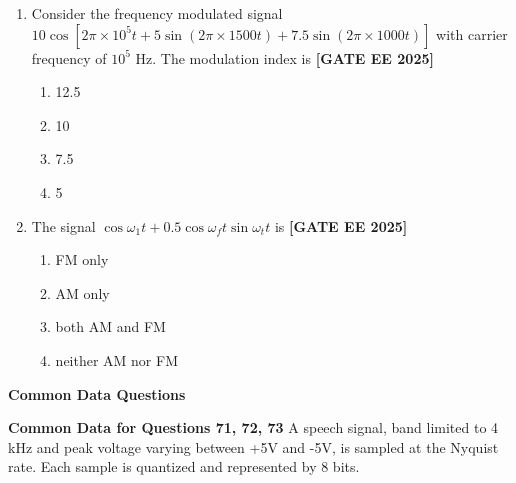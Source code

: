 \documentclass[12pt,a4paper]{article}
\begin{document}
\begin{enumerate}[leftmargin=*, label=\textbf{Q.\arabic*:}]
\item Consider the frequency modulated signal $10\cos[2\pi \times 10^5 t + 5\sin(2\pi \times 1500 t) + 7.5\sin(2\pi \times 1000 t)]$ with carrier frequency of $10^5$ Hz. The modulation index is
\newline
\noindent \textbf{[GATE EE 2025]}
\begin{enumerate}[label=(\Alph*)]
  \item 12.5
  \item 10
  \item 7.5
  \item 5
\end{enumerate}

\item The signal $\cos \omega_1 t + 0.5 \cos \omega_f t \sin \omega_t t$ is
\newline
\noindent \textbf{[GATE EE 2025]}
\begin{enumerate}[label=(\Alph*)]
  \item FM only
  \item AM only
  \item both AM and FM
  \item neither AM nor FM
\end{enumerate}

\end{enumerate}

\vspace{1em}
\item \textbf{Common Data Questions}
\item \textbf{Common Data for Questions 71, 72, 73}
\vspace{1em}
\newline
A speech signal, band limited to 4 kHz and peak voltage varying between +5V and -5V, is sampled at the Nyquist rate. Each sample is quantized and represented by 8 bits.
\end{document}
